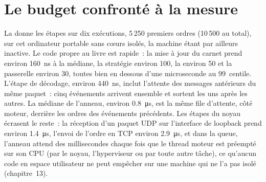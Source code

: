 \label{lst:ll:build-tick-to-trade-measured:loop}

\section{Le budget confronté à la mesure}

La  donne les étapes sur dix exécutions, 5\,250 premiers ordres (10\,500 au total), sur cet
ordinateur portable sans cœurs isolés, la machine étant par ailleurs inactive. Le code propre au livre est rapide~: la mise à jour du carnet prend environ
\qty{160}{\nano\second} à la médiane, la stratégie environ 100, la  environ 50 et la passerelle environ 30, toutes bien en dessous d'une
microseconde au 99~centile. L'étape de décodage, environ \qty{440}{\nano\second}, inclut l'attente des messages antérieurs
du même paquet~: cinq événements arrivent ensemble et sortent les uns après les autres. La médiane de l'anneau, environ \qty{0.8}{\micro\second}, est la
même file d'attente, côté moteur, derrière les ordres des événements précédents. Les étapes du noyau écrasent le reste~: la réception d'un
paquet UDP sur l'interface de loopback prend environ \qty{1.4}{\micro\second}, l'envoi de l'ordre en TCP environ \qty{2.9}{\micro\second},
et dans la queue, l'anneau attend des millisecondes chaque fois que le thread moteur est préempté sur son CPU (par le noyau, l'hyperviseur
ou par toute autre tâche),
ce qu'aucun code en espace utilisateur ne peut empêcher sur une machine qui ne l'a pas isolé (chapitre~13).

